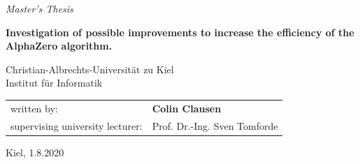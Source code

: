 \documentclass[12pt,onecolumn,oneside,titlepage]{article}
\begin{document}

\begin{center}
{\huge \it Master's Thesis}

\thispagestyle{empty}

\vspace{2cm}

{\Large \bf Investigation of possible improvements to increase the efficiency of the AlphaZero algorithm.}

\vspace{2.25cm}

\vspace{2.25cm}

{\large 
Christian-Albrechts-Universität zu Kiel \\
Institut für Informatik  \\
}

\end{center}

\vspace{2cm}

\begin{tabular}{ll}
written by:             & {\bf Colin Clausen} \\
supervising university lecturer: & Prof. Dr.-Ing. Sven Tomforde \\%
\end{tabular}

\vspace{1cm}

\begin{center}
Kiel, 1.8.2020
\end{center}


\pagebreak

\newpage\null\thispagestyle{empty}\newpage



\vspace{1.5cm}
\end{document}
